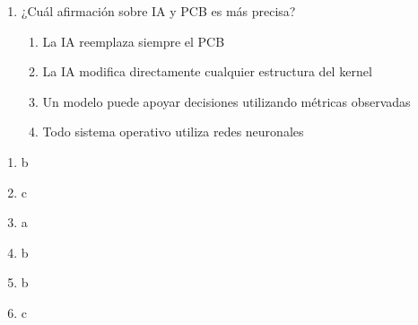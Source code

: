 \documentclass[
  spanish,
  letterpaper,
]{scrbook}
\providecommand{\tightlist}{%
  \setlength{\itemsep}{0pt}\setlength{\parskip}{0pt}}
\begin{document}
\begin{enumerate}
  \begin{enumerate}
  \def\labelenumii{\alph{enumii}.}
  \tightlist
  \item
    Uno\\
  \item
    Dos\\
  \item
    Diez\\
  \item
    Un número ilimitado
  \end{enumerate}
\item
  ¿Cuál afirmación sobre IA y PCB es más precisa?

  \begin{enumerate}
  \def\labelenumii{\alph{enumii}.}
  \tightlist
  \item
    La IA reemplaza siempre el PCB\\
  \item
    La IA modifica directamente cualquier estructura del kernel\\
  \item
    Un modelo puede apoyar decisiones utilizando métricas observadas\\
  \item
    Todo sistema operativo utiliza redes neuronales
  \end{enumerate}
\end{enumerate}

\begin{tcolorbox}[enhanced jigsaw, arc=.35mm, bottomrule=.15mm, bottomtitle=1mm, breakable, colback=white, colbacktitle=quarto-callout-note-color!10!white, colframe=quarto-callout-note-color-frame, coltitle=black, left=2mm, leftrule=.75mm, opacityback=0, opacitybacktitle=0.6, rightrule=.15mm, title=\textcolor{quarto-callout-note-color}{\faInfo}\hspace{0.5em}{Respuestas}, titlerule=0mm, toprule=.15mm, toptitle=1mm]

\begin{enumerate}
\def\labelenumi{\arabic{enumi}.}
\tightlist
\item
  b\\
\item
  c\\
\item
  a\\
\item
  b\\
\item
  b\\
\item
  c
\end{enumerate}

\end{tcolorbox}
\end{document}

